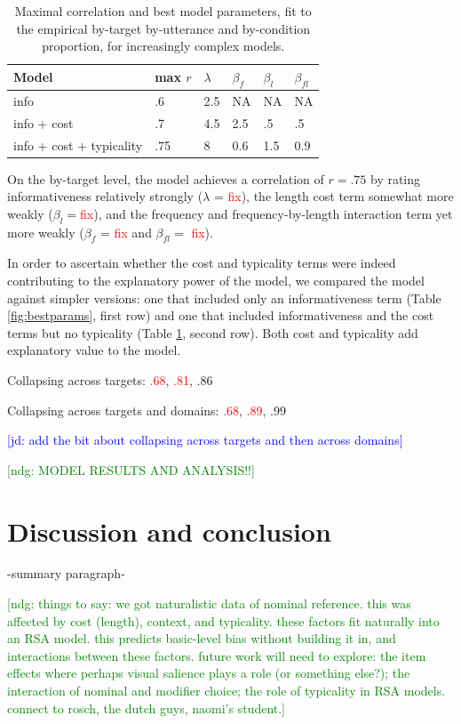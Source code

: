 \documentclass[10pt,letterpaper]{article}
\newcommand{\red}[1]{\textcolor{Red}{#1}}
\newcommand{\ndg}[1]{\textcolor{Green}{[ndg: #1]}}
\newcommand{\jd}[1]{\textcolor{Blue}{[jd: #1]}}
\newcommand{\tableref}[1]{Table \ref{#1}}
\begin{document}
\begin{table}
\caption{Maximal correlation and best model parameters, fit to the empirical by-target by-utterance and by-condition proportion, for increasingly complex models.}
\begin{center}
	\begin{tabular}{l l l l l l}
	\toprule
	Model & max $r$ & $\lambda$ & $\beta_f$ & $\beta_l$ & $\beta_{fl}$\\
	\midrule
	info & .6 & 2.5 & NA & NA & NA\\
	info + cost  & .7 & 4.5 & 2.5 & .5 & .5  \\
	info + cost + typicality  & .75 & 8 & 0.6 & 1.5 & 0.9   \\
	\bottomrule
	\end{tabular}	
\end{center}
\label{tab:bestparams}
\end{table}

On the by-target level, the model achieves a correlation of $r = .75$ by rating informativeness relatively strongly ($\lambda$ = \red{fix}), the length cost term somewhat more weakly ($\beta_l =$\red{fix}), and the frequency and frequency-by-length interaction term yet more weakly ($\beta_f$ = \red{fix} and $\beta_{fl} =$ \red{fix}).

In order to ascertain whether the cost and typicality terms were indeed contributing to the explanatory power of the model, we compared the model against simpler versions: one that included only an informativeness term (\tableref{fig:bestparams}, first row) and one that included informativeness and the cost terms but no typicality (\tableref{tab:bestparams}, second row). Both cost and typicality add explanatory value to the model.

Collapsing across targets: \red{.68}, \red{.81}, .86

Collapsing across targets and domains: \red{.68}, \red{.89}, .99

\jd{add the bit about collapsing across targets and then across domains}

\ndg{MODEL RESULTS AND ANALYSIS!!}


\section{\bf Discussion and conclusion}

-summary paragraph- 

\ndg{things to say: we got naturalistic data of nominal reference. this was affected by cost (length), context, and typicality. these factors fit naturally into an RSA model. this predicts basic-level bias without building it in, and interactions between these factors. future work will need to explore: the item effects where perhaps visual salience plays a role (or something else?); the interaction of nominal and modifier choice; the role of typicality in RSA models. connect to rosch, the dutch guys, naomi's student.}
\end{document}

